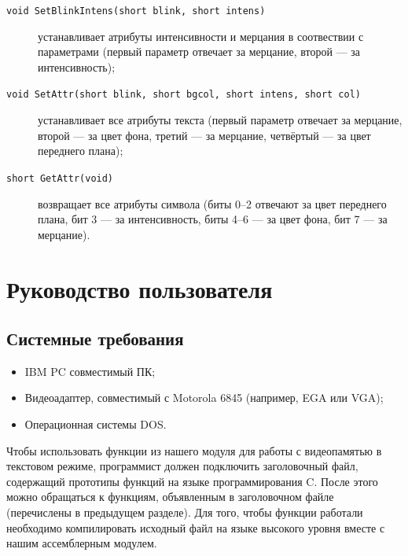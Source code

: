 \documentclass[a4paper,12pt,notitlepage,pdftex,headsepline]{scrartcl}
\begin{document}
\begin{description}
\item[\texttt{void SetBlinkIntens(short blink, short intens)}] устанавливает атрибуты интенсивности и мерцания в соотвествии с параметрами (первый параметр отвечает за мерцание, второй --- за интенсивность);
\item[\texttt{void SetAttr(short blink, short bgcol, short intens, short col)}] устанавливает все атрибуты текста (первый параметр отвечает за мерцание, второй --- за цвет фона, третий --- за мерцание, четвёртый --- за цвет переднего плана);
\item[\texttt{short GetAttr(void)}] возвращает все атрибуты символа (биты 0--2 отвечают за цвет переднего плана, бит 3 --- за интенсивность, биты 4--6 --- за цвет фона, бит 7 --- за мерцание).
\end{description}
\newpage
\section{Руководство пользователя}
\subsection*{Системные требования}
\begin{itemize}
\item IBM PC совместимый ПК;
\item Видеоадаптер, совместимый с Motorola 6845 (например, EGA или VGA);
\item Операционная системы DOS.
\end{itemize}
Чтобы использовать функции из нашего модуля для работы с видеопамятью в текстовом режиме, программист должен подключить заголовочный файл, содержащий прототипы функций на языке программирования C.
После этого можно обращаться к функциям, объявленным в заголовочном файле (перечислены в предыдущем разделе).
Для того, чтобы функции работали необходимо компилировать исходный файл на языке высокого уровня вместе с нашим ассемблерным модулем.
\newpage
{}
\end{document}
